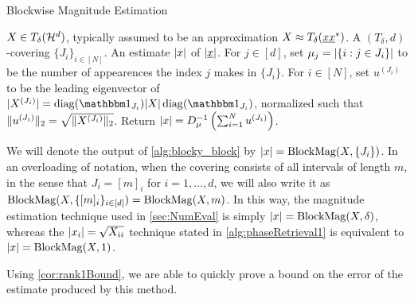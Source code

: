 \begin{algorithm}[htbp]
\renewcommand{\algorithmicrequire}{\textbf{Input:}}
\renewcommand{\algorithmicensure}{\textbf{Output:}}
\caption{Blockwise Magnitude Estimation}
\label{alg:blocky_block}
\begin{algorithmic}[1]
    \REQUIRE $X \in T_\delta(\mathcal{H}^d)$, typically assumed to be an approximation $X \approx T_\delta(\underline{x} \underline{x}^*)$.  A $(T_\delta, d)$-covering $\{J_i\}_{i \in [N]}$.
    \ENSURE An estimate $\lvert x\rvert$ of $\lvert\underline{x}\rvert$.
    \STATE For $j \in [d]$, set $\mu_j = \lvert\{i : j \in J_i\}\rvert$ to be the number of appearences the index $j$ makes in $\{J_i\}$.
    \STATE For $i \in [N]$, set $u^{(J_i)}$ to be the leading eigenvector of $\abs{X^{(J_i)}} = \diag(\one_{J_i}) \abs{X} \diag(\one_{J_i})$, normalized such that $\lVert u^{(J_i)}\rVert_2 = \sqrt{\lVert X^{(J_i)}\rVert_2}$.
    \STATE Return $\lvert x\rvert = D_\mu^{-1}\left(\sum_{i = 1}^N u^{(J_i)}\right)$.
    \end{algorithmic}
\end{algorithm}

We will denote the output of \cref{alg:blocky_block} by $\lvert x\rvert = \operatorname{BlockMag}(X, \{J_i\})$.  In an overloading of notation, when the covering consists of all intervals of length $m$, in the sense that $J_i = [m]_i$ for $i = 1, \ldots, d$, we will also write it as $\operatorname{BlockMag}(X, \{[m]_i\}_{i \in [d]}) = \operatorname{BlockMag}(X, m)$.  In this way, the magnitude estimation technique used in \cref{sec:NumEval} is simply $\lvert x\rvert = \operatorname{BlockMag}(X, \delta)$, whereas the $\lvert x_i\rvert = \sqrt{X_{ii}}$ technique stated in \cref{alg:phaseRetrieval1} is equivalent to $\lvert x\rvert = \operatorname{BlockMag}(X, 1)$.

Using \cref{cor:rank1Bound}, we are able to quickly prove a bound on the error of the estimate produced by this method.

